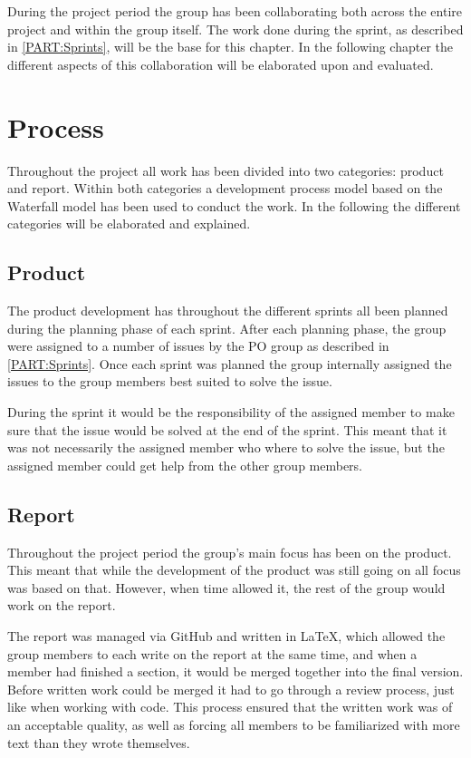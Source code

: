 During the project period the group has been collaborating both across the entire project and within the group itself.
The work done during the sprint, as described in \autoref{PART:Sprints}, will be the base for this chapter.
In the following chapter the different aspects of this collaboration will be elaborated upon and evaluated.

\section{Process}
Throughout the project all work has been divided into two categories: product and report.
Within both categories a development process model based on the Waterfall model has been used to conduct the work.
In the following the different categories will be elaborated and explained.

\subsection{Product}
The product development has throughout the different sprints all been planned during the planning phase of each sprint.
After each planning phase, the group were assigned to a number of issues by the PO group as described in \autoref{PART:Sprints}.
Once each sprint was planned the group internally assigned the issues to the group members best suited to solve the issue.

During the sprint it would be the responsibility of the assigned member to make sure that the issue would be solved at the end of the sprint.
This meant that it was not necessarily the assigned member who where to solve the issue, but the assigned member could get help from the other group members.

\subsection{Report}\label{SEC:InternalCollabReport}
Throughout the project period the group's main focus has been on the product.
This meant that while the development of the product was still going on all focus was based on that.
However, when time allowed it, the rest of the group would work on the report.

The report was managed via GitHub and written in \LaTeX, which allowed the group members to each write on the report at the same time, and when a member had finished a section, it would be merged together into the final version.
Before written work could be merged it had to go through a review process, just like when working with code.
This process ensured that the written work was of an acceptable quality, as well as forcing all members to be familiarized with more text than they wrote themselves.


